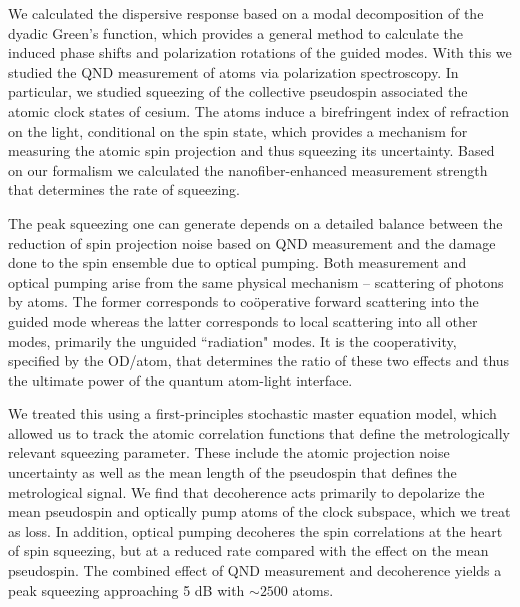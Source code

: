 \documentclass[aps,pra,twocolumn]{revtex4-1} %
\begin{document}
We calculated the dispersive response based on a modal decomposition of the dyadic Green's function, which provides a general method to calculate the induced phase shifts and polarization rotations of the guided modes. 
With this we studied the QND measurement of atoms via polarization spectroscopy. 
In particular, we studied squeezing of the collective pseudospin associated the atomic clock states of cesium. 
The atoms induce a birefringent index of refraction on the light, conditional on the spin state, which provides a mechanism for measuring the atomic spin projection and thus squeezing its uncertainty.  
Based on our formalism we calculated the nanofiber-enhanced measurement strength that determines the rate of squeezing.  

The peak squeezing one can generate depends on a detailed balance between the reduction of spin projection noise based on QND measurement and the damage done to the spin ensemble due to optical pumping.  
Both measurement and optical pumping arise from the same physical mechanism -- scattering of photons by atoms.  
The former corresponds to co\"{o}perative forward scattering into the guided mode whereas the latter corresponds to local scattering into all other modes, primarily the unguided ``radiation" modes.   
It is the cooperativity, specified by the OD/atom, that determines the ratio of these two effects and thus the ultimate power of the quantum atom-light interface. 

We treated this using a first-principles stochastic master equation model, which allowed us to track the atomic correlation functions that define the metrologically relevant squeezing parameter.  
These include the atomic projection noise uncertainty as well as the mean length of the pseudospin that defines the metrological signal.  
We find that decoherence acts primarily to depolarize the mean pseudospin and optically pump atoms of the clock subspace, which we treat as loss.  
In addition, optical pumping decoheres the spin correlations at the heart of spin squeezing, but at a reduced rate compared with the effect on the mean pseudospin.  
The combined effect of QND measurement and decoherence yields a peak squeezing approaching 5 dB with $\sim 2500$ atoms. 
\end{document}
